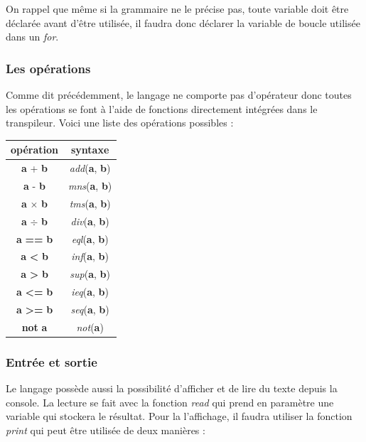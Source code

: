 \documentclass[a4paper]{article}%
\begin{document}
On rappel que même si la grammaire ne le précise pas, toute variable doit être
déclarée avant d'être utilisée, il faudra donc déclarer la variable de boucle
utilisée dans un \textit{for}.

\subsubsection*{Les opérations}
\label{sec:operator}

Comme dit précédemment, le langage ne comporte pas d'opérateur donc toutes
les opérations se font à l'aide de fonctions directement intégrées dans le
transpileur. Voici une liste des opérations possibles :

\begin{center}
\begin{tabular}{ | c | c | }
    \hline
    opération & syntaxe\\
    \hline
    \textbf{a} + \textbf{b} & \textit{add}(\textbf{a}, \textbf{b})\\
    \hline
    \textbf{a} - \textbf{b} & \textit{mns}(\textbf{a}, \textbf{b})\\
    \hline
    \textbf{a} $\times$ \textbf{b} & \textit{tms}(\textbf{a}, \textbf{b})\\
    \hline
    \textbf{a} $\div$ \textbf{b} & \textit{div}(\textbf{a}, \textbf{b})\\
    \hline
    \textbf{a} \textbf{==} \textbf{b} & \textit{eql}(\textbf{a}, \textbf{b})\\
    \hline
    \textbf{a} \textbf{<} \textbf{b} & \textit{inf}(\textbf{a}, \textbf{b})\\
    \hline
    \textbf{a} \textbf{>} \textbf{b} & \textit{sup}(\textbf{a}, \textbf{b})\\
    \hline
    \textbf{a} \textbf{<=} \textbf{b} & \textit{ieq}(\textbf{a}, \textbf{b})\\
    \hline
    \textbf{a} \textbf{>=} \textbf{b} & \textit{seq}(\textbf{a}, \textbf{b})\\
    \hline
    \textbf{not} \textbf{a} & \textit{not}(\textbf{a})\\
    \hline
\end{tabular}
\end{center}

\subsubsection*{Entrée et sortie}

Le langage possède aussi la possibilité d'afficher et de lire du texte depuis la
console. La lecture se fait avec la fonction \textit{read} qui prend en
paramètre une variable qui stockera le résultat. Pour la l'affichage, il faudra
utiliser la fonction \textit{print} qui peut être utilisée de deux manières :
\end{document}

